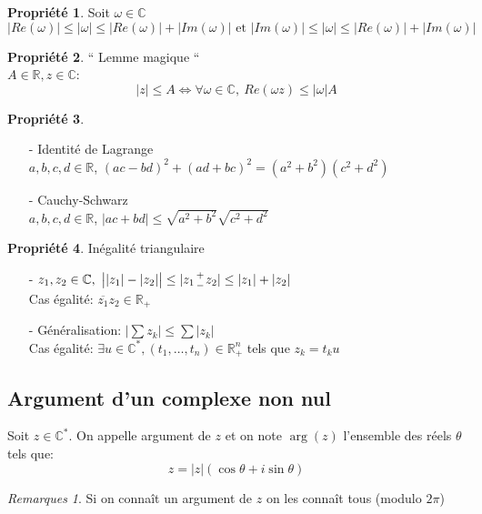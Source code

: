 \documentclass[fleqn]{article}
\theoremstyle{definition} \newtheorem*{defi}{D\'efinition}
\theoremstyle{definition} \newtheorem*{theo}{Th\'eor\`eme}
\theoremstyle{definition} \newtheorem*{coro}{Corollaire}
\theoremstyle{remark} \newtheorem*{rqs}{Remarques}
\theoremstyle{definition} \newtheorem*{prop}{Propri\'et\'e}
\newcommand*{\bfrac}[2]{\genfrac{}{}{0pt}{}{#1}{#2}}
\begin{document}
\begin{prop} Soit $\omega \in \mathbb{C}$
	\[|Re(\omega)| \leq |\omega| \leq |Re(\omega)| + |Im(\omega)| \text{ et } |Im(\omega)| \leq |\omega| \leq |Re(\omega)| + |Im(\omega)|\]
\end{prop}

\begin{prop} `` Lemme magique `` \\
	$A \in \mathbb{R}, z \in \mathbb{C}$:
	\[|z| \leq A \Leftrightarrow \forall \omega \in \mathbb{C},\ Re(\omega z) \leq |\omega|A\]
\end{prop}

\begin{prop} $ $
	\begin{itemize}
		\item [-] Identit\'e de Lagrange \\
			$a,b,c,d \in \mathbb{R}$, $(ac - bd)^2 + (ad + bc)^2 = (a^2 + b^2)(c^2 + d^2)$
		\item [-] Cauchy-Schwarz \\
			$a,b,c,d \in \mathbb{R}$, $|ac + bd| \leq \sqrt{a^2 + b^2} \sqrt{c^2 + d^2}$
	\end{itemize}
\end{prop}

\begin{prop} In\'egalit\'e triangulaire
	\begin{itemize}
		\item [-] $z_1, z_2 \in \mathbb{C},\ \big||z_1| - |z_2|\big| \leq |z_1 \bfrac{+}{-} z_2| \leq |z_1| + |z_2|$ \\
			Cas \'egalit\'e: $\overline{z_1}z_2 \in \mathbb{R}_+$
		\item [-] G\'en\'eralisation: $|\sum z_k| \leq \sum |z_k|$ \\
			Cas \'egalit\'e: $\exists u \in \mathbb{C}^*, (t_1, \hdots, t_n) \in \mathbb{R}_+^n$ tels que $z_k = t_ku$
	\end{itemize}
\end{prop}

\subsection{Argument d'un complexe non nul}
Soit $z \in \mathbb{C}^*$. On appelle argument de $z$ et on note $\arg(z)$ l'ensemble des r\'eels $\theta$ tels que:
\[z = |z|(\cos \theta + i \sin \theta)\]
\begin{rqs}
	Si on conna\^it un argument de $z$ on les conna\^it tous (modulo $2\pi$)
\end{rqs}
\end{document}
